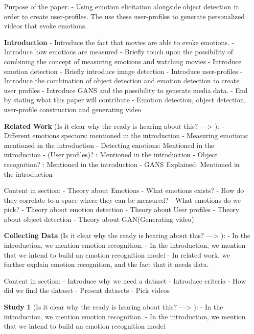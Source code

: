 Purpose of the paper:
    - Using emotion elicitation alongside object detection in order to create user-profiles. The use these user-profiles to generate personalized videos that evoke emotions. 

\textbf{Introduction}
 - Introduce the fact that movies are able to evoke emotions.
 - Introduce how emotions are measured
 - Briefly touch upon the possibility of combining the concept of measuring emotions and watching movies
 - Introduce emotion detection
 - Briefly introduce image detection
 - Introduce user-profiles
 - Introduce the combination of object detection and emotion detection to create user profiles
 - Introduce GANS and the possibility to generate media data.
 - End by stating what this paper will contribute
    - Emotion detection, object detection, user-profile construction and generating video

\textbf{Related Work}
(Is it clear why the ready is hearing about this? ---> ):
    - Different emotions spectors: mentioned in the introduction
    - Measuring emotions: mentioned in the introduction
    - Detecting emotions: Mentioned in the introduction
    - (User profiles)? : Mentioned in the introduction
    - Object recognition? : Mentioned in the introduction
    - GANS Explained: Mentioned in the introduction

Content in section:
- Theory about Emotions
    - What emotions exists?
    - How do they correlate to a space where they can be measured?
    - What emotions do we pick?
- Theory about emotion detection
- Theory about User profiles
- Theory about object detection
- Theory about GAN(Generating video)

\textbf{Collecting Data}
(Is it clear why the ready is hearing about this? ---> ):
    - In the introduction, we mention emotion recognition.
    - In the introduction, we mention that we intend to build an emotion recognition model
    - In related work, we further explain emotion recognition, and the fact that it needs data.

Content in section:
- Introduce why we need a dataset
- Introduce criteria 
- How did we find the dataset
- Present datasets 
- Pick videos

\textbf{Study 1}
(Is it clear why the ready is hearing about this? ---> ):
    - In the introduction, we mention emotion recognition.
    - In the introduction, we mention that we intend to build an emotion recognition model

